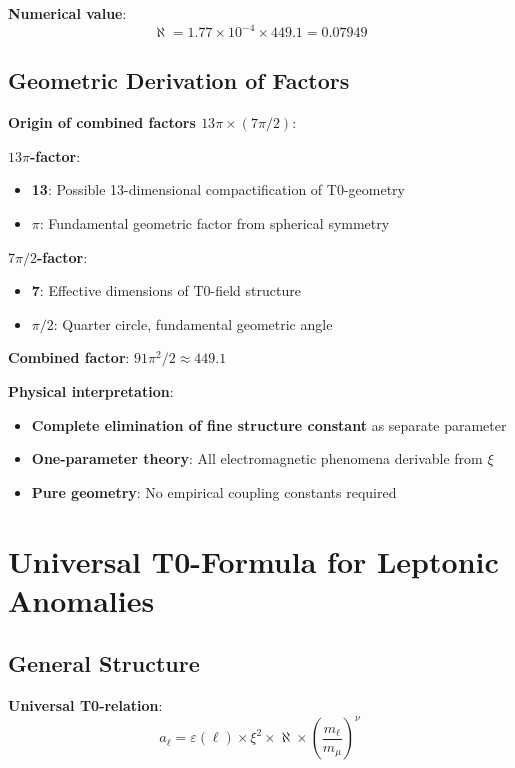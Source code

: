 \documentclass[12pt,a4paper]{article}
\newcommand{\xipar}{\xi}
\newcommand{\nulep}{\nu}
\newcommand{\epsilonlep}{\varepsilon}
\begin{document}
	\textbf{Numerical value}:
	\begin{equation}
		\aleph = 1.77 \times 10^{-4} \times 449.1 = 0.07949
	\end{equation}
	
	\subsection{Geometric Derivation of Factors}
	
	\textbf{Origin of combined factors $13\pi \times (7\pi/2)$}:
	
	\textbf{$13\pi$-factor}:
	\begin{itemize}
		\item \textbf{13}: Possible 13-dimensional compactification of T0-geometry
		\item \textbf{$\pi$}: Fundamental geometric factor from spherical symmetry
	\end{itemize}
	
	\textbf{$7\pi/2$-factor}:
	\begin{itemize}
		\item \textbf{7}: Effective dimensions of T0-field structure
		\item \textbf{$\pi/2$}: Quarter circle, fundamental geometric angle
	\end{itemize}
	
	\textbf{Combined factor}: $91\pi^2/2 \approx 449.1$
	
	\textbf{Physical interpretation}:
	\begin{itemize}
		\item \textbf{Complete elimination of fine structure constant} as separate parameter
		\item \textbf{One-parameter theory}: All electromagnetic phenomena derivable from $\xipar$
		\item \textbf{Pure geometry}: No empirical coupling constants required
	\end{itemize}
	
	\section{Universal T0-Formula for Leptonic Anomalies}
	
	\subsection{General Structure}
	
	\textbf{Universal T0-relation}:
	\begin{equation}
		a_\ell = \epsilonlep(\ell) \times \xipar^2 \times \aleph \times \left(\frac{m_\ell}{m_\mu}\right)^\nulep
	\end{equation}
	
\end{document}
